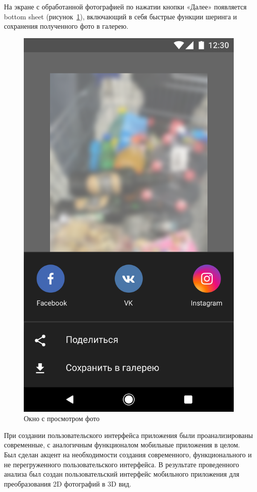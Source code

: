 На экране с обработанной фотографией по нажатии кнопки «Далее» появляется bottom sheet (рисунок~\ref{fig:Artboard2}), включающий в себя быстрые функции шеринга и сохранения полученного фото в галерею.

\begin{figure}[H]
	\centering
	\includegraphics[width=0.6\linewidth]{pics/Artboard2}
	\caption{Окно с просмотром фото}
	\label{fig:Artboard2}
\end{figure}

При создании пользовательского интерфейса приложения были проанализированы современные, с аналогичным функционалом мобильные приложения в целом. Был сделан акцент на необходимости создания современного, функционального и не перегруженного пользовательского интерфейса. В результате проведенного анализа был создан пользовательский интерфейс мобильного приложения для преобразования 2D фотографий в 3D вид.